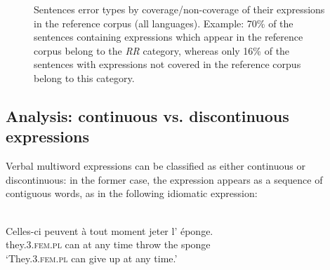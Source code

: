 \documentclass[output=paper
,modfonts
,nonflat]{langsci/langscibook}
\begin{document}
\begin{figure}
  \caption{{Sentences error types by coverage/non-coverage of
      their expressions in the reference corpus (all languages).}  Example: 70\% of
    the sentences containing expressions which appear in the reference
    corpus belong to the {\em RR} category, whereas only 16\% of the
    sentences with expressions not covered in the reference corpus
    belong to this category.\label{fig:coverage}}
\end{figure}


\subsection{Analysis: continuous vs. discontinuous expressions}
\label{analysisContig}

Verbal multiword expressions can be classified as either continuous
or discontinuous: in the former case, the expression appears as a sequence of
contiguous words, as in the following idiomatic expression:

\vspace*{.2cm}

\begin{minipage}{\linewidth}
\ea 
{}\\
\gll Celles-ci peuvent à tout moment jeter l' éponge.\\
     they.\textsc{3.fem.pl} can at any time throw the sponge\\
\glt `They.\textsc{3.fem.pl} can give up at any time.'\\
\z
\end{minipage}\\
\\
\end{document}
